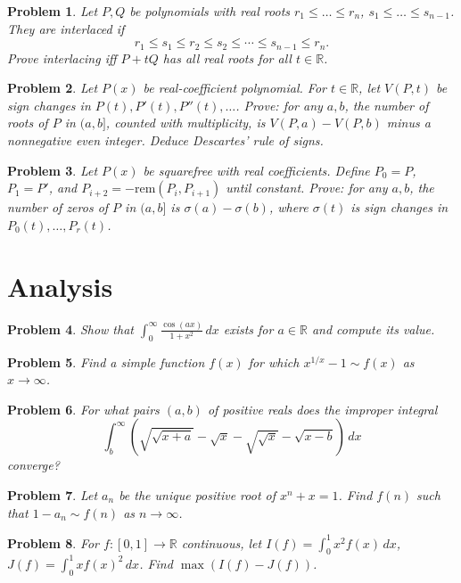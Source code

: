 \documentclass[12pt]{article}
\newtheorem{problem}{Problem}
\begin{document}
\begin{problem}
Let $P,Q$ be polynomials with real roots $r_1\leq\dots\leq r_n$, $s_1\leq\dots\leq s_{n-1}$. They are interlaced if
\[
r_1\leq s_1\leq r_2\leq s_2\leq\cdots\leq s_{n-1}\leq r_n.
\]
Prove interlacing iff $P+tQ$ has all real roots for all $t\in\mathbb{R}$.
\end{problem}

\begin{problem}
Let $P(x)$ be real-coefficient polynomial. For $t\in\mathbb{R}$, let $V(P,t)$ be sign changes in $P(t),P'(t),P''(t),\dots$. Prove: for any $a,b$, the number of roots of $P$ in $(a,b]$, counted with multiplicity, is $V(P,a)-V(P,b)$ minus a nonnegative even integer. Deduce Descartes' rule of signs.
\end{problem}

\begin{problem}
Let $P(x)$ be squarefree with real coefficients. Define $P_0=P$, $P_1=P'$, and $P_{i+2}=-\mathrm{rem}(P_i,P_{i+1})$ until constant. Prove: for any $a,b$, the number of zeros of $P$ in $(a,b]$ is $\sigma(a)-\sigma(b)$, where $\sigma(t)$ is sign changes in $P_0(t),\dots,P_r(t)$.
\end{problem}

\section*{Analysis}

\begin{problem}
Show that $\int_0^\infty \frac{\cos(ax)}{1+x^2}\,dx$ exists for $a\in\mathbb{R}$ and compute its value.
\end{problem}

\begin{problem}
Find a simple function $f(x)$ for which $x^{1/x}-1 \sim f(x)$ as $x\to\infty$.
\end{problem}

\begin{problem}
For what pairs $(a,b)$ of positive reals does the improper integral
\[
\int_b^\infty \left(\sqrt{\sqrt{x+a}}-\sqrt{x}-\sqrt{\sqrt{x}}-\sqrt{x-b}\right)\,dx
\]
converge?
\end{problem}

\begin{problem}
Let $a_n$ be the unique positive root of $x^n+x=1$. Find $f(n)$ such that $1-a_n\sim f(n)$ as $n\to\infty$.
\end{problem}

\begin{problem}
For $f:[0,1]\to\mathbb{R}$ continuous, let $I(f)=\int_0^1 x^2f(x)\,dx$, $J(f)=\int_0^1 xf(x)^2\,dx$. Find $\max(I(f)-J(f))$.
\end{problem}
\end{document}
